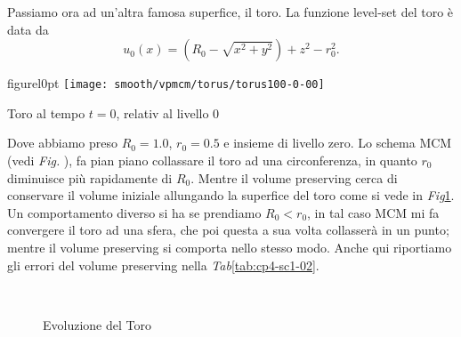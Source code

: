 \newpage
Passiamo ora ad un'altra famosa superfice, il toro. La funzione
level-set del toro è data da
\[
u_0(x) = \left(R_0-\sqrt{x^2+y^2}\right)+z^2-r_0^2.
\]

\begin{wrapfloat}{figure}{l}{0pt}
\texttt{[image: smooth/vpmcm/torus/torus100-0-00]}
\caption{Toro al tempo $t=0$, relativ al livello $0$}
\end{wrapfloat}

Dove abbiamo preso $R_0=1.0$, $r_0=0.5$ e insieme di livello zero. Lo
schema MCM (vedi \emph{Fig.} ), fa pian piano collassare il toro ad
una circonferenza, in quanto $r_0$ diminuisce più rapidamente di
$R_0$.  Mentre il volume preserving cerca di conservare il volume
iniziale  allungando la superfice del toro come si vede in
\emph{Fig}\ref{fig:cp4-sc1-02}. Un comportamento diverso si ha se
prendiamo $R_0<r_0$, in tal caso MCM mi fa convergere il toro ad una
sfera, che poi questa a sua volta collasserà in un punto; mentre il
volume preserving si comporta nello stesso modo. Anche qui riportiamo
gli errori del volume preserving nella \emph{Tab}\ref{tab:cp4-sc1-02}.

\begin{figure}[htb!]
  \centering
  \quad
  \\
  \quad
  \quad
  \caption{Evoluzione del Toro}
  \label{fig:cp4-sc1-02}
\end{figure}

